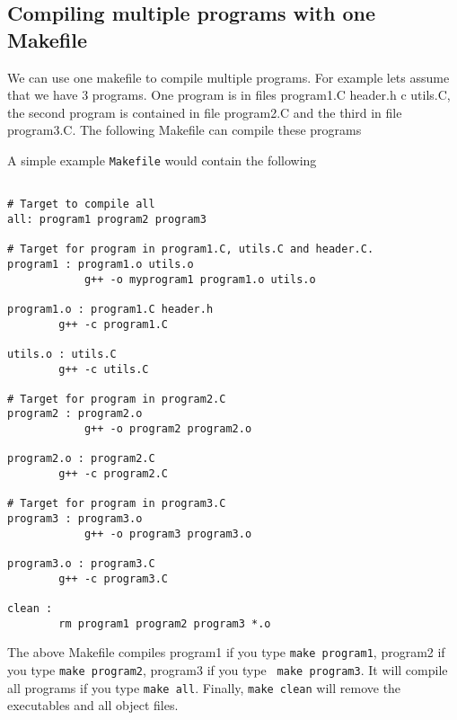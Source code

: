 \documentclass[aps,showpacs,prd,notitlepage,preprintnumbers,amsmath,amssymb,letterpaper]{revtex4}
\begin{document}
\subsection{Compiling multiple programs with one Makefile}

We can use one makefile to compile multiple programs.  For example
lets assume that we have 3 programs. One program is in files
program1.C header.h c utils.C, the second program is contained in file
program2.C and the third in file program3.C. The following Makefile
can compile these programs

A simple example {\tt Makefile} would contain the following
\begin{verbatim}

# Target to compile all
all: program1 program2 program3

# Target for program in program1.C, utils.C and header.C. 
program1 : program1.o utils.o
            g++ -o myprogram1 program1.o utils.o

program1.o : program1.C header.h
        g++ -c program1.C

utils.o : utils.C
        g++ -c utils.C

# Target for program in program2.C
program2 : program2.o
            g++ -o program2 program2.o

program2.o : program2.C
        g++ -c program2.C

# Target for program in program3.C
program3 : program3.o
            g++ -o program3 program3.o

program3.o : program3.C
        g++ -c program3.C

clean :
        rm program1 program2 program3 *.o

\end{verbatim}

The above Makefile compiles program1 if you type {\tt make program1},
program2 if you type {\tt make program2}, program3 if you type {\tt
  make program3}. It will compile all programs if you type {\tt make
  all}. Finally, {\tt make clean} will remove the executables and all
object files.
\end{document}
